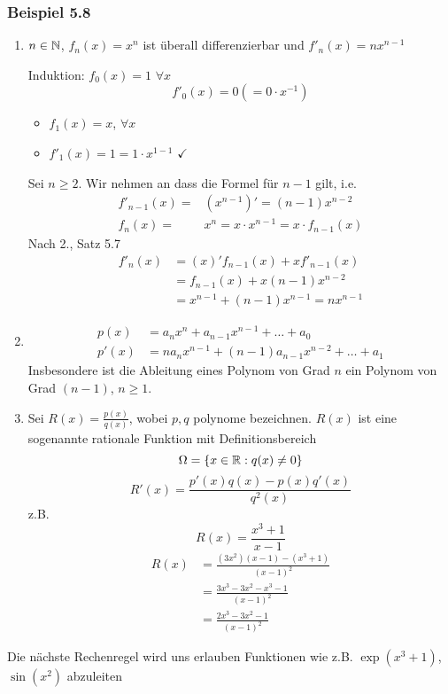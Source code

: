 \subsubsection*{Beispiel 5.8}
\begin{enumerate}
\item $n\in\mathbb{N}$, $f_n\left( x\right)=x^n$ ist überall differenzierbar und $f'_n\left( x\right) = nx^{n-1}$ 
\begin{beweis}{}
Induktion: $f_0\left( x\right) = 1$ $\forall x$ \[f'_0\left( x\right) = 0 \left( = 0\cdot x^{-1}\right)\]
\begin{itemize}
\item $f_1\left( x\right) = x$, $\forall x$
\item $f'_1\left( x\right) = 1 = 1\cdot x^{1-1}$ $\checkmark$
\end{itemize}
Sei $n\geq 2$. Wir nehmen an dass die Formel für $n-1$ gilt, i.e. 
\begin{align*}
f{'_{n - 1}}\left( x \right) =& \left( {{x^{n - 1}}} \right)' = \left( {n - 1} \right){x^{n - 2}}\\
{f_n}\left( x \right) =&  {x^n} = x \cdot {x^{n - 1}} = x \cdot {f_{n - 1}}\left( x \right)
\end{align*}
Nach 2., Satz 5.7 
\begin{align*}
f{'_n}\left( x \right) &= \left( x \right)'{f_{n - 1}}\left( x \right) + xf{'_{n - 1}}\left( x \right)\\
 &= {f_{n - 1}}\left( x \right) + x\left( {n - 1} \right){x^{n - 2}}\\
 &= {x^{n - 1}} + \left( {n - 1} \right){x^{n - 1}} = n{x^{n - 1}}
\end{align*}
\end{beweis}
\item \begin{align*}
p(x)&=a_nx^n+a_{n-1}x^{n-1}+\dots+a_0\\
p'(x)&=na_nx^{n-1}+\left( n-1\right)a_{n-1}x^{n-2}+\dots+a_1
\end{align*}
Insbesondere ist die Ableitung eines Polynom von Grad $n$ ein Polynom von Grad $\left( n-1\right)$, $n\geq 1$.
\item Sei $R(x)=\frac{p(x)}{q(x)}$, wobei $p,q$ polynome bezeichnen. $R(x)$ ist eine sogenannte rationale Funktion mit Definitionsbereich 
\[\Omega = \left\{ x\in\mathbb{R} : q(x)\not=0\right\}\]
\[R'(x) = \frac{{p'(x)q(x) - p(x)q'(x)}}{{{q^2}(x)}}\]
z.B. \[R(x) = \frac{{{x^3} + 1}}{{x - 1}}\]
\begin{align*}
R(x) &= \frac{{\left( {3{x^2}} \right)\left( {x - 1} \right) - \left( {{x^3} + 1} \right)}}{{{{\left( {x - 1} \right)}^2}}}\\
 &= \frac{{3{x^3} - 3{x^2} - {x^3} - 1}}{{{{\left( {x - 1} \right)}^2}}}\\
 &= \frac{{2{x^3} - 3{x^2} - 1}}{{{{\left( {x - 1} \right)}^2}}}
\end{align*}
\end{enumerate}
Die nächste Rechenregel wird uns erlauben Funktionen wie z.B. $\exp\left( x^3+1\right)$, $\sin\left( x^2\right)$ abzuleiten

